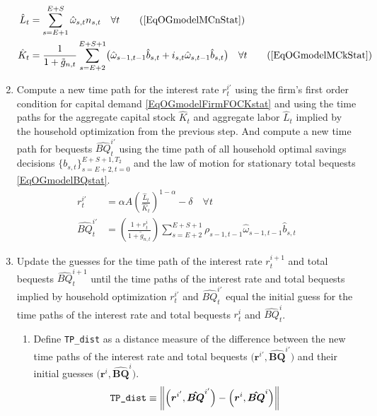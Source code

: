 \documentclass[letterpaper,12pt]{article}
\theoremstyle{definition}
\newcommand\norm[1]{\left\lVert#1\right\rVert}
\begin{document}
\begin{enumerate}
      \begin{align}
        \hat{L}_t &= \sum_{s=E+1}^{E+S}\hat{\omega}_{s,t}n_{s,t}\quad\forall t \tag{\ref{EqOGmodelMCnStat}} \\
        \hat{K}_t &= \frac{1}{1 + \tilde{g}_{n,t}}\sum_{s=E+2}^{E+S+1}\bigl(\hat{\omega}_{s-1,t-1}\hat{b}_{s,t} + i_{s,t}\hat{\omega}_{s,t-1}\hat{b}_{s,t}\bigr) \quad\forall t \tag{\ref{EqOGmodelMCkStat}}
      \end{align}
      \item Compute a new time path for the interest rate $r_t^{i'}$ using the firm's first order condition for capital demand \eqref{EqOGmodelFirmFOCKstat} and using the time paths for the aggregate capital stock $\hat{K}_t$ and aggregate labor $\hat{L}_t$ implied by the household optimization from the previous step. And compute a new time path for bequests $\hat{BQ}_t^{i'}$ using the time path of all household optimal savings decisions $\{b_{s,t}\}_{s=E+2,t=0}^{E+S+1,T_2}$ and the law of motion for stationary total bequests \eqref{EqOGmodelBQstat}.
      \begin{align}
        r_t^{i'} &= \alpha A\left(\frac{\hat{L}_t}{\hat{K}_t}\right)^{1-\alpha} - \delta \quad\forall t \label{EqOGmodelTPrnew} \\
        \hat{BQ}_t^{i'} &= \left(\frac{1 + r_t^i}{1 + \tilde{g}_{n,t}}\right)\sum_{s=E+2}^{E+S+1}\rho_{s-1,t-1}\hat{\omega}_{s-1,t-1}\hat{b}_{s,t} \label{EqOGmodelTPBQnew}
      \end{align}
      \item Update the guesses for the time path of the interest rate $r_t^{i+1}$ and total bequests $\hat{BQ}_t^{i+1}$ until the time paths of the interest rate and total bequests implied by household optimization $r_t^{i'}$ and $\hat{BQ}_t^{i'}$ equal the initial guess for the time paths of the interest rate and total bequests $r_t^{i}$ and $\hat{BQ}_t^{i}$.
      \begin{enumerate}
        \item Define \texttt{TP\_dist} as a distance measure of the difference between the new time paths of the interest rate and total bequests $\bigl(\bm{r}^{i'},\bm{\hat{BQ}}^{i'}\bigr)$ and their initial guesses $\bigl(\bm{r}^{i},\bm{\hat{BQ}}^{i}\bigr)$.
        \begin{equation}\label{EqOGmodelTPdist}
          \texttt{TP\_dist} \equiv \norm{\Bigl(\bm{r}^{i'},\bm{\hat{BQ}}^{i'}\Bigr) - \Bigl(\bm{r}^{i},\bm{\hat{BQ}}^{i}\Bigr)}
        \end{equation}


\end{enumerate}
\end{enumerate}
\end{document}
